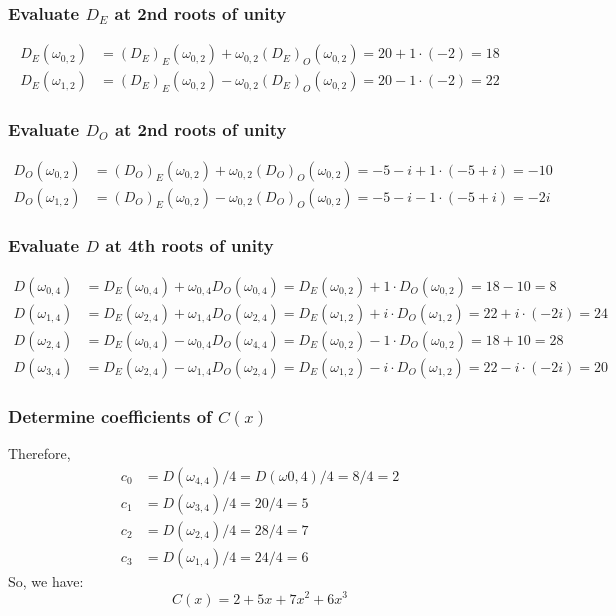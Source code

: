 \documentclass{article}
\begin{document}
\subsubsection{Evaluate $D_E$ at 2nd roots of unity}
\begin{align*}
D_E(\omega_{0,2}) &= (D_E)_E(\omega_{0,2})+\omega_{0,2}(D_E)_O(\omega_{0,2}) =20+1\cdot (-2) =18\\
D_E(\omega_{1,2}) &= (D_E)_E(\omega_{0,2})-\omega_{0,2}(D_E)_O(\omega_{0,2}) =20-1\cdot (-2) =22
\end{align*}

\subsubsection{Evaluate $D_O$ at 2nd roots of unity}
\begin{align*}
D_O(\omega_{0,2}) &= (D_O)_E(\omega_{0,2})+\omega_{0,2}(D_O)_O(\omega_{0,2}) =-5-i+1\cdot (-5+i) =-10\\
D_O(\omega_{1,2}) &= (D_O)_E(\omega_{0,2})-\omega_{0,2}(D_O)_O(\omega_{0,2}) =-5-i-1\cdot (-5+i) =-2i
\end{align*}
\subsubsection{Evaluate $D$ at 4th roots of unity}
\begin{align*}
D(\omega_{0,4}) &= D_E(\omega_{0,4}) + \omega_{0,4}D_O(\omega_{0,4}) = D_E(\omega_{0,2}) + 1\cdot D_O(\omega_{0,2}) =18-10 =8 \\
D(\omega_{1,4}) &= D_E(\omega_{2,4}) + \omega_{1,4}D_O(\omega_{2,4})= D_E(\omega_{1,2}) + i\cdot D_O(\omega_{1,2}) =22+i\cdot (-2i) =24\\
D(\omega_{2,4}) &= D_E(\omega_{0,4}) - \omega_{0,4}D_O(\omega_{4,4}) =D_E(\omega_{0,2}) - 1\cdot D_O(\omega_{0,2}) =18+10 =28 \\
D(\omega_{3,4}) &= D_E(\omega_{2,4}) - \omega_{1,4}D_O(\omega_{2,4}) =D_E(\omega_{1,2}) - i\cdot D_O(\omega_{1,2}) =22-i \cdot (-2i)=20
\end{align*}

\subsubsection{Determine coefficients of $C(x)$}

Therefore,
\begin{align*}
c_0 &= D(\omega_{4,4})/4 = D(\omega{0,4})/4 = 8/4 =2 \\
c_1 &= D(\omega_{3,4})/4 = 20/4 = 5 \\
c_2 &= D(\omega_{2,4})/4 = 28/4=7 \\
c_3 &= D(\omega_{1,4})/4 = 24/4=6
\end{align*}
So, we have:
$$C(x) = 2 + 5x + 7x^2 + 6x^3 $$
\end{document}
